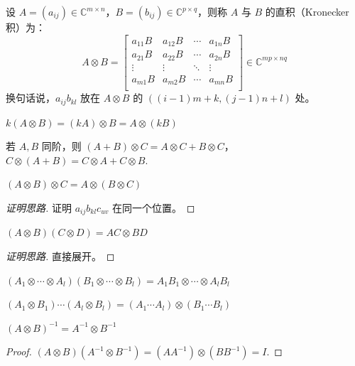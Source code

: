\begin{definition}[直积 / Kronecker 积]
设 $A=(a_{ij})\in\mathbb C^{m\times n}$，$B=(b_{ij})\in\mathbb C^{p\times q}$，则称 $A$ 与 $B$ 的直积（Kronecker 积）为：
\[
    A\otimes B=
    \begin{bmatrix}
    a_{11}B&a_{12}B&\cdots&a_{1n}B\\
    a_{21}B&a_{22}B&\cdots&a_{2n}B\\
    \vdots&\vdots&\ddots&\vdots\\
    a_{m1}B&a_{m2}B&\cdots&a_{mn}B\\
    \end{bmatrix}\in\mathbb C^{mp\times nq}
\]
换句话说，$a_{ij}b_{kl}$ 放在 $A\otimes B$ 的 $((i-1)m+k,(j-1)n+l)$ 处。
\end{definition}

\begin{property}
$k(A\otimes B)=(kA)\otimes B=A\otimes(kB)$
\end{property}

\begin{property}
若 $A,B$ 同阶，则 $(A+B)\otimes C=A\otimes C+B\otimes C$，$C\otimes(A+B)=C\otimes A+C\otimes B$.
\end{property}

\begin{property}
$(A\otimes B)\otimes C=A\otimes(B\otimes C)$
\end{property}
\begin{proof}[证明思路]
证明 $a_{ij}b_{kl}c_{uv}$ 在同一个位置。
\end{proof}

\begin{property}
$(A\otimes B)(C\otimes D)=AC\otimes BD$
\end{property}
\begin{proof}[证明思路]
直接展开。
\end{proof}

\begin{property}
$(A_1\otimes\cdots\otimes A_l)(B_1\otimes\cdots\otimes B_l)=A_1B_1\otimes\cdots\otimes A_lB_l$
\end{property}

\begin{property}
$(A_1\otimes B_1)\cdots(A_l\otimes B_l)=(A_1\cdots A_l)\otimes(B_1\cdots B_l)$
\end{property}

\begin{property}
$(A\otimes B)^{-1}=A^{-1}\otimes B^{-1}$
\end{property}
\begin{proof}
$(A\otimes B)(A^{-1}\otimes B^{-1})=(AA^{-1})\otimes(BB^{-1})=I$.
\end{proof}

